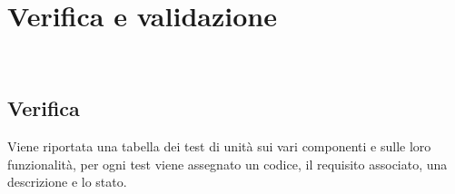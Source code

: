 
\chapter{Verifica e validazione}
\label{cap:verifica}

\\

\section{Verifica}
Viene riportata una tabella dei test di unità sui vari componenti e sulle loro funzionalità, per ogni test viene assegnato un codice, il requisito associato, una descrizione e lo stato.
